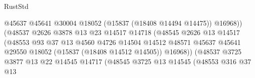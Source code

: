 \begin{lexlean}{RustStd}
\begin{coremodule}
{\begin{coremodule}
{{{{{{{{{{{{{{{{{{{{{{{{{{{{{{{{{{{{{{{{{{{{{{{{{{{{{{{{{{{{                                                @45637
                                                @45641
                                                @30004
                                                @18052
                                                (@15837 (@18408 @14494 @14475))
                                                @16968))
                                            (@48537
                                              @2626
                                              @3878
                                              @13
                                              @23
                                              @14517
                                              @14718
                                              (@48545
                                                @2626
                                                @13
                                                @14517
                                                (@48553
                                                  @93
                                                  @37
                                                  @13
                                                  @4560
                                                  @4726
                                                  @14504
                                                  @14512
                                                  @48571
                                                  @45637
                                                  @45641
                                                  @29550
                                                  @18052
                                                  (@15837 (@18408 @14512 @14505))
                                                  @16968))
                                              (@48537
                                                @3725
                                                @3877
                                                @13
                                                @22
                                                @14545
                                                @14717
                                                (@48545
                                                  @3725
                                                  @13
                                                  @14545
                                                  (@48553
                                                    @316
                                                    @37
                                                    @13
}}}}}}}}}}}}}}}}}}}}}}}}}}}}}}}}}}}}}}}}}}}}}}}}}}}}}}}}}}}}
\end{coremodule}}
\end{coremodule}
\end{lexlean}
